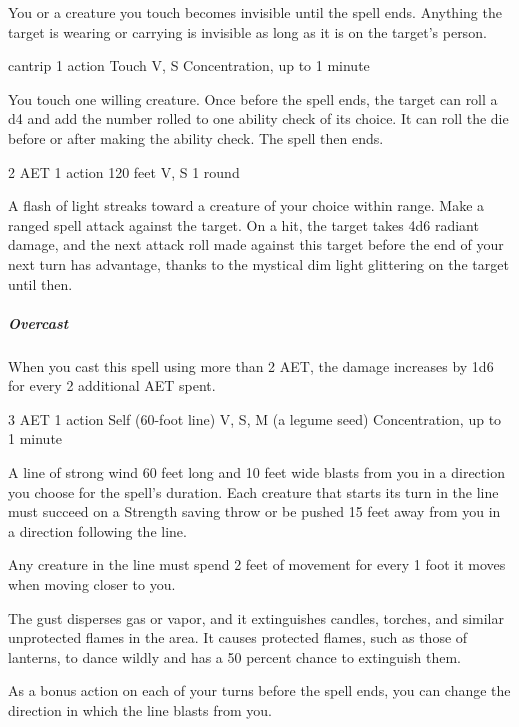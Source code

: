 You or a creature you touch becomes invisible until the spell ends. Anything the target is wearing or carrying is invisible as long as it is on the target's person.


{cantrip}
{1 action}
{Touch}
{V, S}
{Concentration, up to 1 minute}

You touch one willing creature. Once before the spell ends, the target can roll a d4 and add the number rolled to one ability check of its choice. It can roll the die before or after making the ability check. The spell then ends.


{2 AET}
{1 action}
{120 feet}
{V, S}
{1 round}

A flash of light streaks toward a creature of your choice within range. Make a ranged spell attack against the target. On a hit, the target takes 4d6 radiant damage, and the next attack roll made against this target before the end of your next turn has advantage, thanks to the mystical dim light glittering on the target until then.

\subparagraph*{Overcast} When you cast this spell using more than 2 AET, the damage increases by 1d6 for every 2 additional AET spent.

{3 AET}
{1 action}
{Self (60-foot line)}
{V, S, M (a legume seed)}
{Concentration, up to 1 minute}

A line of strong wind 60 feet long and 10 feet wide blasts from you in a direction you choose for the spell's duration. Each creature that starts its turn in the line must succeed on a Strength saving throw or be pushed 15 feet away from you in a direction following the line.

Any creature in the line must spend 2 feet of movement for every 1 foot it moves when moving closer to you.

The gust disperses gas or vapor, and it extinguishes candles, torches, and similar unprotected flames in the area. It causes protected flames, such as those of lanterns, to dance wildly and has a 50 percent chance to extinguish them.

As a bonus action on each of your turns before the spell ends, you can change the direction in which the line blasts from you.